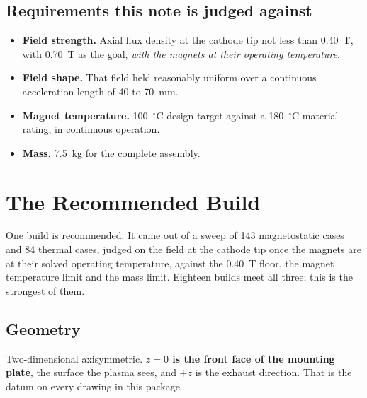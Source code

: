 \documentclass[11pt,a4paper]{article}
\newcommand{\degC}{$^\circ$C}
\begin{document}
\subsection{Requirements this note is judged against}
\begin{itemize}[itemsep=2pt]
  \item \textbf{Field strength.} Axial flux density at the cathode tip not less
        than 0.40~T, with 0.70~T as the goal, \emph{with the magnets at their
        operating temperature}.
  \item \textbf{Field shape.} That field held reasonably uniform over a
        continuous acceleration length of 40 to 70~mm.
  \item \textbf{Magnet temperature.} 100~\degC{} design target against a
        180~\degC{} material rating, in continuous operation.
  \item \textbf{Mass.} 7.5~kg for the complete assembly.
\end{itemize}

\section{The Recommended Build}
\label{sec:build}

One build is recommended. It came out of a sweep of 143 magnetostatic cases and
84 thermal cases, judged on the field at the cathode tip once the magnets are
at their solved operating temperature, against the 0.40~T floor, the magnet
temperature limit and the mass limit. Eighteen builds meet all three; this is
the strongest of them.

\subsection{Geometry}
Two-dimensional axisymmetric. \textbf{$z = 0$ is the front face of the mounting
plate}, the surface the plasma sees, and $+z$ is the exhaust direction. That is
the datum on every drawing in this package.
\end{document}
